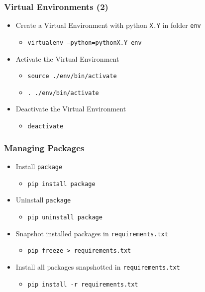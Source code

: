 \documentclass{beamer}
\begin{document}
\begin{frame}
    \frametitle{Virtual Environments (2)}
    \begin{itemize}
        \item Create a Virtual Environment with python \texttt{X.Y} in folder \texttt{env}
        \begin{itemize}
            \item \texttt{virtualenv --python=pythonX.Y env}
        \end{itemize}
        \item Activate the Virtual Environment
        \begin{itemize}
            \item \texttt{source ./env/bin/activate}
            \item \texttt{. ./env/bin/activate}
        \end{itemize}
        \item Deactivate the Virtual Environment
        \begin{itemize}
            \item \texttt{deactivate}
        \end{itemize}        
    \end{itemize}
\end{frame}

\begin{frame}
    \frametitle{Managing Packages}
    \begin{itemize}
        \item Install \texttt{package}
        \begin{itemize}
            \item \texttt{pip install \texttt{package}}
        \end{itemize}
        \item Uninstall \texttt{package}
        \begin{itemize}
            \item \texttt{pip uninstall \texttt{package}}
        \end{itemize}
        \item Snapshot installed packages in \texttt{requirements.txt}
        \begin{itemize}
            \item \texttt{pip freeze > requirements.txt}
        \end{itemize}        
        \item Install all packages snapshotted in \texttt{requirements.txt}
        \begin{itemize}
            \item \texttt{pip install -r requirements.txt}
        \end{itemize}
    \end{itemize}
\end{frame}
\end{document}
